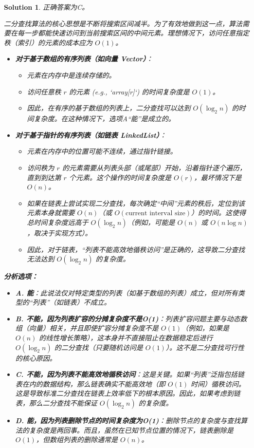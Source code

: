 \documentclass[UTF8]{report}
\newtheorem{solution}{Solution}
\theoremstyle{MyLineTheoremStyle} %
\theoremstyle{MyBlockTheoremStyle} %
\theoremstyle{MySubsubsectionStyle} %
\begin{document}
\begin{solution}
正确答案为C。

二分查找算法的核心思想是不断将搜索区间减半。为了有效地做到这一点，算法需要在每一步都能快速访问到当前搜索区间的中间元素。理想情况下，访问任意指定秩（索引）的元素的成本应为 $O(1)$。

\begin{itemize}
    \item \textbf{对于基于数组的有序列表（如向量 Vector）}：
    \begin{itemize}
        \item 元素在内存中是连续存储的。
        \item 访问任意秩 $r$ 的元素 (e.g., `array[r]`) 的时间复杂度是 $O(1)$。
        \item 因此，在有序的基于数组的列表上，二分查找可以达到 $O(\log_2 n)$ 的时间复杂度。在这种情况下，选项A“能”是成立的。
    \end{itemize}

    \item \textbf{对于基于指针的有序列表（如链表 LinkedList）}：
    \begin{itemize}
        \item 元素在内存中的位置可能不连续，通过指针链接。
        \item 访问秩为 $r$ 的元素需要从列表头部（或尾部）开始，沿着指针逐个遍历，直到到达第 $r$ 个元素。这个操作的时间复杂度是 $O(r)$，最坏情况下是 $O(n)$。
        \item 如果在链表上尝试实现二分查找，每次确定“中间”元素的秩后，定位到该元素本身就需要 $O(n)$（或 $O(\text{current interval size})$）的时间。这使得总时间复杂度远高于 $O(\log_2 n)$（例如，可能是 $O(n)$ 或 $O(n \log n)$，取决于实现方式）。
        \item 因此，对于链表，“列表不能高效地循秩访问”是正确的，这导致二分查找无法达到 $O(\log_2 n)$ 的复杂度。
    \end{itemize}
\end{itemize}

\textbf{分析选项：}
\begin{itemize}
    \item \textbf{A. 能}：此说法仅对特定类型的列表（如基于数组的列表）成立，但对所有类型的“列表”（如链表）不成立。
    \item \textbf{B. 不能，因为列表扩容的分摊复杂度不是O(1)}：列表扩容问题主要与动态数组（向量）相关，并且即使扩容分摊复杂度不是 $O(1)$（例如，如果是 $O(n)$ 的线性增长策略），这本身并不直接阻止在数据稳定后进行 $O(\log_2 n)$ 的二分查找（只要随机访问是 $O(1)$）。这不是二分查找可行性的核心原因。
    \item \textbf{C. 不能，因为列表不能高效地循秩访问}：这是关键。如果“列表”泛指包括链表在内的数据结构，那么链表确实不能高效地（即 $O(1)$ 时间）循秩访问。这是导致标准二分查找在链表上效率低下的根本原因。因此，如果考虑到链表，那么二分查找不能保证 $O(\log_2 n)$ 的复杂度。
    \item \textbf{D. 能，因为列表删除节点的时间复杂度为O(1)}：删除节点的复杂度与查找算法的复杂度是两回事。而且，虽然在已知节点位置的情况下，链表删除是 $O(1)$，但数组列表的删除通常是 $O(n)$。
\end{itemize}


\end{solution}
\end{document}
